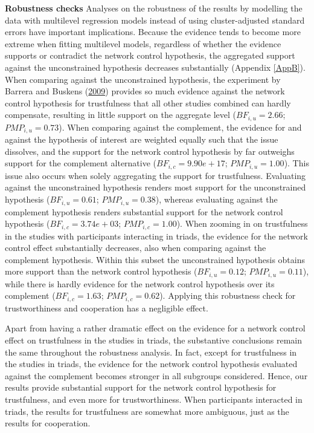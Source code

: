 \documentclass[
  11pt,
]{article}
\begin{document}
\textbf{Robustness checks} \hspace{8pt} Analyses on the robustness of the results by modelling the data with multilevel regression models instead of using cluster-adjusted standard errors have important implications.
Because the evidence tends to become more extreme when fitting multilevel models, regardless of whether the evidence supports or contradict the network control hypothesis, the aggregated support against the unconstrained hypothesis decreases substantially (Appendix \ref{AppB}).
When comparing against the unconstrained hypothesis, the experiment by Barrera and Buskens (\protect\hyperlink{ref-barrera_buskens_third_2009}{2009}) provides so much evidence against the network control hypothesis for trustfulness that all other studies combined can hardly compensate, resulting in little support on the aggregate level (\(BF_{i,u} = 2.66\); \(PMP_{i,u} = 0.73\)).
When comparing against the complement, the evidence for and against the hypothesis of interest are weighted equally such that the issue dissolves, and the support for the network control hypothesis by far outweighs support for the complement alternative (\(BF_{i,c} = 9.90e+17\); \(PMP_{i,u} = 1.00\)).
This issue also occurs when solely aggregating the support for trustfulness.
Evaluating against the unconstrained hypothesis renders most support for the unconstrained hypothesis (\(BF_{i,u} = 0.61\); \(PMP_{i,u} = 0.38\)), whereas evaluating against the complement hypothesis renders substantial support for the network control hypothesis (\(BF_{i,c} = 3.74e+03\); \(PMP_{i,c} = 1.00\)).
When zooming in on trustfulness in the studies with participants interacting in triads, the evidence for the network control effect substantially decreases, also when comparing against the complement hypothesis.
Within this subset the unconstrained hypothesis obtains more support than the network control hypothesis (\(BF_{i,u} = 0.12\); \(PMP_{i,u} = 0.11\)), while there is hardly evidence for the network control hypothesis over its complement (\(BF_{i,c} = 1.63\); \(PMP_{i,c} = 0.62\)).
Applying this robustness check for trustworthiness and cooperation has a negligible effect.

Apart from having a rather dramatic effect on the evidence for a network control effect on trustfulness in the studies in triads, the substantive conclusions remain the same throughout the robustness analysis.
In fact, except for trustfulness in the studies in triads, the evidence for the network control hypothesis evaluated against the complement becomes stronger in all subgroups considered.
Hence, our results provide substantial support for the network control hypothesis for trustfulness, and even more for trustworthiness.
When participants interacted in triads, the results for trustfulness are somewhat more ambiguous, just as the results for cooperation.
\end{document}
